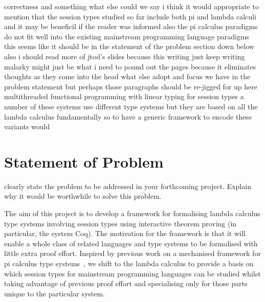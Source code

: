 \documentclass{mprop}
\begin{document}
correctness and something what else could we say i think it would appropriate
to mention that the session types studied so far include both pi and lambda
calculi and it may be beneficil if the reader was informed also the pi
calculus paradigms do not fit well into the existing mainstream programming
language paradigms this seems like it should be in the statement of the problem section down below also i should read more of jtod's slides because this writing just keep writing malarky might just be what i need to pound out the pages because it eliminates thoughts as they come into the head what else adopt and focus we have in the problem statement but perhaps those paragraphs should be re-jigged for up here multithreaded functional programming with linear typing for session types a number of these systems use different type systems but they are based on all the lambda calculus fundamentally so to have a generic framework to encode these variants would 

\section{Statement of Problem}

clearly state the problem to be addressed in your forthcoming project. Explain
why it would be worthwhile to solve this problem.

The aim of this project is to develop a framework for formalising lambda
calculus type systems involving session types using interactive theorem
proving (in particular, the system Coq). The motivation for the framework is
that it will enable a whole class of related languages and type systems to be
formalised with little extra proof effort. Inspired by previous work on a
mechanised framework for pi calculus type systems~\cite{Gay:2001:FFP}, we
shift to the lambda calculus to provide a basis on which session types for
mainstream programming languages can be studied whilst taking advantage of
previous proof effort and specialising only for those parts unique to the
particular system.
\end{document}
